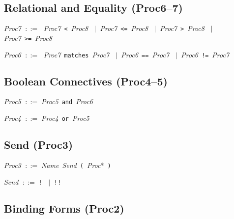\documentclass[11pt,a4paper]{article}
\newcommand{\kw}[1]{\texttt{\textcolor{kw}{#1}}}       %
\newcommand{\sym}[1]{\texttt{#1}}                       %
\newcommand{\nt}[1]{\textit{\textcolor{nt}{#1}}}        %
\newcommand{\OR}{\ensuremath{\;\mid\;}}                  %
\newcommand{\bnfdef}{\ensuremath{\;::=\;}}               %
\newenvironment{grammar}{%
  \par\smallskip\begin{list}{}{%
    \setlength{\leftmargin}{1.5em}%
    \setlength{\itemsep}{2pt}%
    \setlength{\parsep}{0pt}}%
}{\end{list}\smallskip}
\begin{document}
\subsection{Relational and Equality (Proc6--7)}

\begin{grammar}
\item \nt{Proc7} \bnfdef
    \nt{Proc7}~\sym{<}~\nt{Proc8}
    \OR \nt{Proc7}~\sym{<=}~\nt{Proc8}
    \OR \nt{Proc7}~\sym{>}~\nt{Proc8}
    \OR \nt{Proc7}~\sym{>=}~\nt{Proc8}
\item \nt{Proc6} \bnfdef
    \nt{Proc7}~\kw{matches}~\nt{Proc7}
    \OR \nt{Proc6}~\sym{==}~\nt{Proc7}
    \OR \nt{Proc6}~\sym{!=}~\nt{Proc7}
\end{grammar}

\subsection{Boolean Connectives (Proc4--5)}

\begin{grammar}
\item \nt{Proc5} \bnfdef \nt{Proc5}~\kw{and}~\nt{Proc6}
\item \nt{Proc4} \bnfdef \nt{Proc4}~\kw{or}~\nt{Proc5}
\end{grammar}

\subsection{Send (Proc3)}

\begin{grammar}
\item \nt{Proc3} \bnfdef \nt{Name}~\nt{Send}~\sym{(}~\nt{Proc}*~\sym{)}
\item \nt{Send} \bnfdef \sym{!} \OR \sym{!!}
\end{grammar}

\subsection{Binding Forms (Proc2)}
\end{document}
